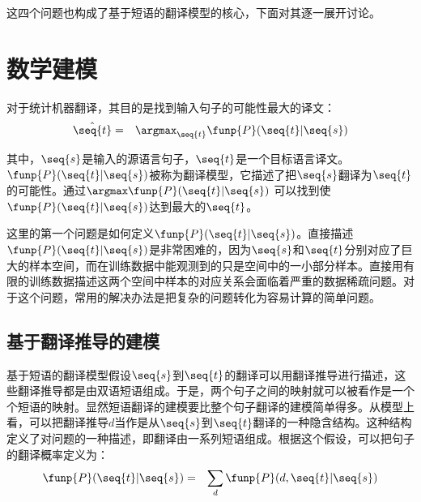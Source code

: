 \parinterval 这四个问题也构成了基于短语的翻译模型的核心，下面对其逐一展开讨论。

\sectionnewpage
\section{数学建模}\label{section-7.2}

\parinterval 对于统计机器翻译，其目的是找到输入句子的可能性最大的译文：
\begin{eqnarray}
\hat{\seq{t}} & = & \argmax_{\seq{t}} \funp{P}(\seq{t}|\seq{s})
\label{eq:7-2}
\end{eqnarray}

\noindent 其中，$\seq{s}$是输入的源语言句子，$\seq{t}$是一个目标语言译文。$\funp{P}(\seq{t}|\seq{s})$被称为翻译模型，它描述了把$\seq{s}$翻译为$\seq{t}$的可能性。通过$\argmax \funp{P}(\seq{t}|\seq{s})$ 可以找到使$\funp{P}(\seq{t}|\seq{s})$达到最大的$\seq{t}$。

\parinterval 这里的第一个问题是如何定义$\funp{P}(\seq{t}|\seq{s})$。直接描述$\funp{P}(\seq{t}|\seq{s})$是非常困难的，因为$\seq{s}$和$\seq{t}$分别对应了巨大的样本空间，而在训练数据中能观测到的只是空间中的一小部分样本。直接用有限的训练数据描述这两个空间中样本的对应关系会面临着严重的数据稀疏问题。对于这个问题，常用的解决办法是把复杂的问题转化为容易计算的简单问题。


\subsection{基于翻译推导的建模}

\parinterval 基于短语的翻译模型假设$\seq{s}$到$\seq{t}$的翻译可以用翻译推导进行描述，这些翻译推导都是由双语短语组成。于是，两个句子之间的映射就可以被看作是一个个短语的映射。显然短语翻译的建模要比整个句子翻译的建模简单得多。从模型上看，可以把翻译推导$d$当作是从$\seq{s}$到$\seq{t}$翻译的一种隐含结构。这种结构定义了对问题的一种描述，即翻译由一系列短语组成。根据这个假设，可以把句子的翻译概率定义为：
\begin{eqnarray}
\funp{P}(\seq{t}|\seq{s}) & = & \sum_{d} \funp{P}(d,\seq{t}|\seq{s})
\label{eq:7-3}
\end{eqnarray}


